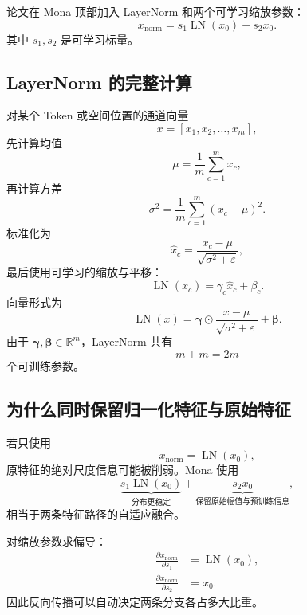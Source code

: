 \documentclass[UTF8,12pt,a4paper,fontset=none]{ctexart}
\newcommand{\R}{\mathbb{R}}
\newcommand{\LN}{\operatorname{LN}}
\begin{document}
论文在 Mona 顶部加入 LayerNorm 和两个可学习缩放参数：
\begin{equation}
 x_{\mathrm{norm}}
 =s_1\LN(x_0)+s_2x_0.
 \tag{3}
\end{equation}
其中 $s_1,s_2$ 是可学习标量。

\subsection{LayerNorm 的完整计算}

对某个 Token 或空间位置的通道向量
\begin{equation}
 x=[x_1,x_2,\ldots,x_m],
\end{equation}
先计算均值
\begin{equation}
 \mu=\frac{1}{m}\sum_{c=1}^{m}x_c,
\end{equation}
再计算方差
\begin{equation}
 \sigma^2=\frac{1}{m}\sum_{c=1}^{m}(x_c-\mu)^2.
\end{equation}
标准化为
\begin{equation}
 \widehat{x}_c
 =\frac{x_c-\mu}{\sqrt{\sigma^2+\varepsilon}},
\end{equation}
最后使用可学习的缩放与平移：
\begin{equation}
 \LN(x_c)=\gamma_c\widehat{x}_c+\beta_c.
\end{equation}
向量形式为
\begin{equation}
 \LN(x)
 =\bm{\gamma}\odot
 \frac{x-\mu}{\sqrt{\sigma^2+\varepsilon}}
 +\bm{\beta}.
\end{equation}
由于 $\bm{\gamma},\bm{\beta}\in\R^m$，LayerNorm 共有
\begin{equation}
 m+m=2m
\end{equation}
个可训练参数。

\subsection{为什么同时保留归一化特征与原始特征}

若只使用
\begin{equation}
 x_{\mathrm{norm}}=\LN(x_0),
\end{equation}
原特征的绝对尺度信息可能被削弱。Mona 使用
\begin{equation}
 \underbrace{s_1\LN(x_0)}_{\text{分布更稳定}}
 +
 \underbrace{s_2x_0}_{\text{保留原始幅值与预训练信息}},
\end{equation}
相当于两条特征路径的自适应融合。

对缩放参数求偏导：
\begin{align}
 \frac{\partial x_{\mathrm{norm}}}{\partial s_1}
 &=\LN(x_0),\\
 \frac{\partial x_{\mathrm{norm}}}{\partial s_2}
 &=x_0.
\end{align}
因此反向传播可以自动决定两条分支各占多大比重。
\end{document}
